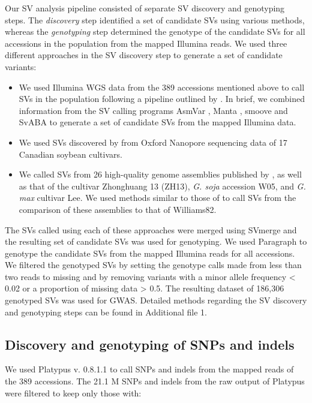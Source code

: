Our SV analysis pipeline consisted of separate SV discovery and genotyping steps.
The \emph{discovery} step identified a set of candidate SVs using various methods,
whereas the \emph{genotyping} step determined the genotype
of the candidate SVs for all accessions in the population from the mapped Illumina reads. We used three different
approaches in the SV discovery step to generate a set of candidate variants:

\begin{itemize}
	\item We used Illumina WGS data from the 389 accessions mentioned above
		to call SVs in the population following a pipeline outlined
		by \cite{lemay2022}. In brief, we combined information from
		the SV calling programs AsmVar \citep{liu2015}, Manta \citep{chen2016},
		smoove \citep{pedersen2019} and SvABA \citep{wala2018} to generate
		a set of candidate SVs from the mapped Illumina data.
	\item We used SVs discovered by \cite{lemay2022} from Oxford Nanopore
		sequencing data of 17 Canadian soybean cultivars.
	\item We called SVs from 26 high-quality genome assemblies published by
		\cite{liu2020-pangenome}, as well as that of the cultivar Zhonghuang 13 (ZH13),
		\textit{G. soja} accession W05, and \textit{G. max} cultivar Lee.
		We used methods similar to those of \cite{liu2020-pangenome} to call
		SVs from the comparison of these assemblies to that of Williams82.
\end{itemize}

The SVs called using each of these approaches were merged using SVmerge
\citep{wong2010} and the resulting set of candidate SVs was used for
genotyping. We used Paragraph \citep{chen2019} to genotype the candidate SVs
from the mapped Illumina reads for all accessions. We filtered the genotyped
SVs by setting the genotype calls made from less than two reads to missing and
by removing variants with a minor allele frequency < 0.02 or a proportion of
missing data > 0.5. The resulting dataset of 186,306 genotyped SVs was used for
GWAS. Detailed methods regarding the SV discovery and genotyping steps can be
found in Additional file 1.

\subsection*{Discovery and genotyping of SNPs and indels}
\label{sv-gwas-snp-discovery}

We used Platypus v. 0.8.1.1 \citep{rimmer2014} to call SNPs and indels from the
mapped reads of the 389 accessions. The 21.1 M SNPs and
indels from the raw output of Platypus were filtered to keep only those with:

